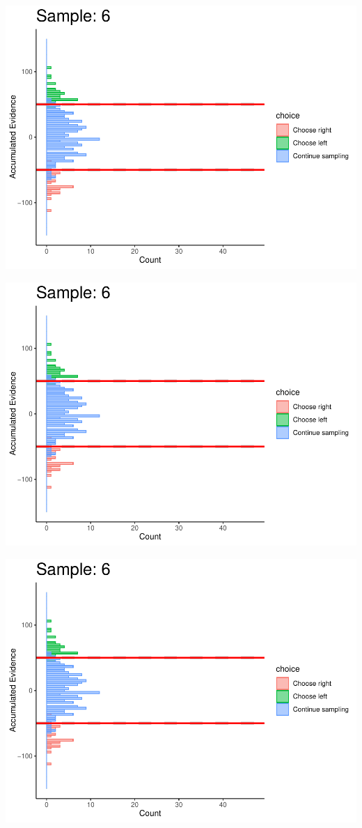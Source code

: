 \documentclass[
]{book}
\begin{document}
\begin{center}\includegraphics[width=0.8\linewidth]{LateNightBayes_files/figure-latex/fixed_dcb-52} \end{center}

\begin{center}\includegraphics[width=0.8\linewidth]{LateNightBayes_files/figure-latex/fixed_dcb-53} \end{center}

\begin{center}\includegraphics[width=0.8\linewidth]{LateNightBayes_files/figure-latex/fixed_dcb-54} \end{center}
\end{document}
